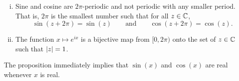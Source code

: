\begin{prop}
\begin{enumerate}[(i)]
For all $z \in \C$, 
\begin{equation*}
e^{2\pi i} = 1 \qquad \text{and} \qquad e^{z + i 2\pi} = e^z.
\end{equation*}
\item
Sine and cosine are $2\pi$-periodic and not periodic with any smaller
period.  That is, $2\pi$ is the smallest number such that for all $z \in \C$,
\begin{equation*}
\sin(z+2\pi) = \sin(z)
\qquad \text{and} \qquad
\cos(z+2\pi) = \cos(z) .
\end{equation*}
\item
The function $x \mapsto e^{ix}$ is a bijective map from $[0,2\pi)$
onto the set of $z \in \C$ such that $\lvert {z} \rvert = 1$.
\end{enumerate}
\end{prop}

The proposition immediately implies that $\sin(x)$ and $\cos(x)$ are 
real whenever $x$ is real.

